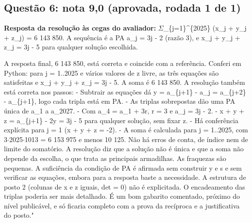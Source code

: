 \documentclass{article}%
\begin{document}
\subsection*{Questão 6: nota 9,0 (aprovada, rodada 1 de 1)}%
\textbf{Resposta da resolução às cegas do avaliador:} $\Sigma$\_\{j=1\}\^{}\{2025\} (x\_j + y\_j + z\_j) = 6 143 850. A sequência é a PA a\_j = 3j - 2 (razão 3), e x\_j + y\_j + z\_j = 3j - 5 para qualquer solução escolhida.\par %
A resposta final, 6 143 850, está correta e coincide com a referência. Conferi em Python: para j = 1..2025 e vários valores de z livre, as três equações são satisfeitas e x\_j + y\_j + z\_j = 3j - 5. A soma é 6 143 850.\newline%
\newline%
A resolução também está correta nos passos:\newline%
{-} Subtrair as equações dá y = a\_\{j+1\} - a\_j = a\_\{j+2\} - a\_\{j+1\}, logo cada tripla está em PA.\newline%
{-} As triplas sobrepostas dão uma PA única de a\_1 a a\_2027.\newline%
{-} Com a\_4 = a\_1 + 3r, r = 3 e a\_j = 3j - 2.\newline%
{-} x + y + z = a\_\{j+1\} - 2y = 3j - 5 para qualquer solução, sem fixar z.\newline%
{-} Há conferência explícita para j = 1 (x + y + z = -2).\newline%
{-} A soma é calculada para j = 1..2025, com 3$\cdot$2025$\cdot$1013 = 6 153 975 e menos 10 125.\newline%
\newline%
Não há erros de conta, de índice nem de limite do somatório. A resolução diz que a solução não é única e que a soma não depende da escolha, o que trata as principais armadilhas.\newline%
\newline%
As fraquezas são pequenas. A suficiência da condição de PA é afirmada sem construir y e s e sem verificar as equações, embora para a resposta baste a necessidade. A estrutura de posto 2 (colunas de x e z iguais, det = 0) não é explicitada. O encadeamento das triplas poderia ser mais detalhado. É um bom gabarito comentado, próximo do nível publicável, e só ficaria completo com a prova da recíproca e a justificativa do posto."%
\end{document}
